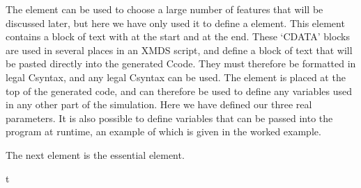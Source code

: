 \documentclass[letterpaper,10pt,english]{sphinxmanual}
\begin{document}
\begin{sphinxVerbatim}[commandchars=\\\{\}]
      \PYG{c+cp}{\PYGZlt{}![CDATA[}
         
         
         
      \PYG{c+cp}{]]\PYGZgt{}}
\end{sphinxVerbatim}

\sphinxAtStartPar
The  element can be used to choose a large number of features that will be discussed later, but here we have only used it to define a  element.  This element contains a block of text with \sphinxcode{\sphinxupquote{\textless{}!{[}CDATA{[}}} at the start and \sphinxcode{\sphinxupquote{{]}{]}\textgreater{}}} at the end.  These ‘CDATA’ blocks  are used in several places in an XMDS script, and define a block of text that will be pasted directly into the generated C\sphinxhyphen{}code.  They must therefore be formatted in legal C\sphinxhyphen{}syntax, and any legal C\sphinxhyphen{}syntax can be used.  The  element is placed at the top of the generated code, and can therefore be used to define any variables used in any other part of the simulation.   Here we have defined our three real parameters.  It is also possible to define variables that can be passed into the program at run\sphinxhyphen{}time, an example of which is given in the {\hyperref[\detokenize{worked_examples:wignerarguments}]{}} worked example.

\sphinxAtStartPar
The next element is the essential  element.

\begin{sphinxVerbatim}[commandchars=\\\{\}]
   t 
\end{sphinxVerbatim}
\end{document}
